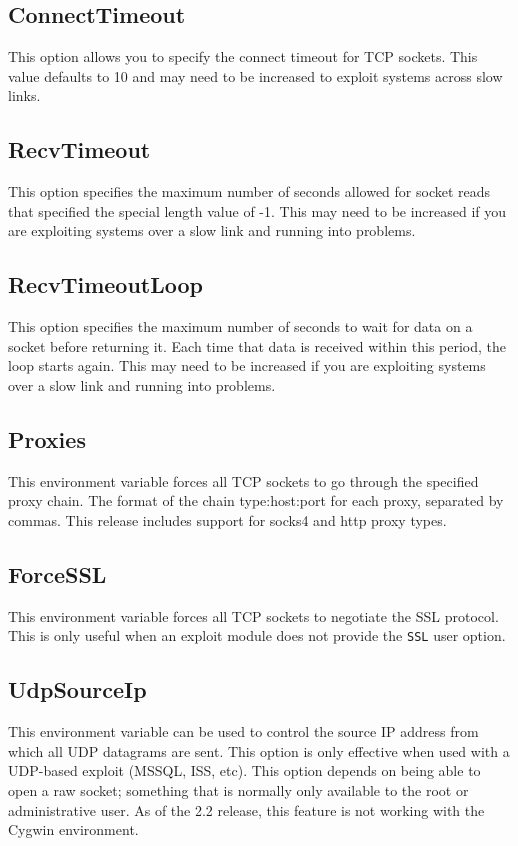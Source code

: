 \documentclass{report}
\begin{document}
	\subsection{ConnectTimeout}
\par
This option allows you to specify the connect timeout for TCP sockets. This
value defaults to 10 and may need to be increased to exploit systems across slow links. 

	\subsection{RecvTimeout}
\par
This option specifies the maximum number of seconds allowed for socket reads
that specified the special length value of -1. This may need to be increased if
you are exploiting systems over a slow link and running into problems. 

	\subsection{RecvTimeoutLoop}
\par
This option specifies the maximum number of seconds to wait for data on a socket
before returning it. Each time that data is received within this period, the
loop starts again. This may need to be increased if you are exploiting systems
over a slow link and running into problems.  

	\subsection{Proxies}
\par
This environment variable forces all TCP sockets to go through the specified
proxy chain. The format of the chain type:host:port for each proxy, separated by
commas. This release includes support for socks4 and http proxy types. 

	\subsection{ForceSSL}
\par
This environment variable forces all TCP sockets to negotiate the SSL protocol.
This is only useful when an exploit module does not provide the \texttt{SSL}
user option.  

	\subsection{UdpSourceIp}
\par
This environment variable can be used to control the source IP address from
which all UDP datagrams are sent. This option is only effective when used with a
UDP-based exploit (MSSQL, ISS, etc). This option depends on being able to open a
raw socket; something that is normally only available to the root or
administrative user. As of the 2.2 release, this feature is not working with the
Cygwin environment. 
\end{document}
